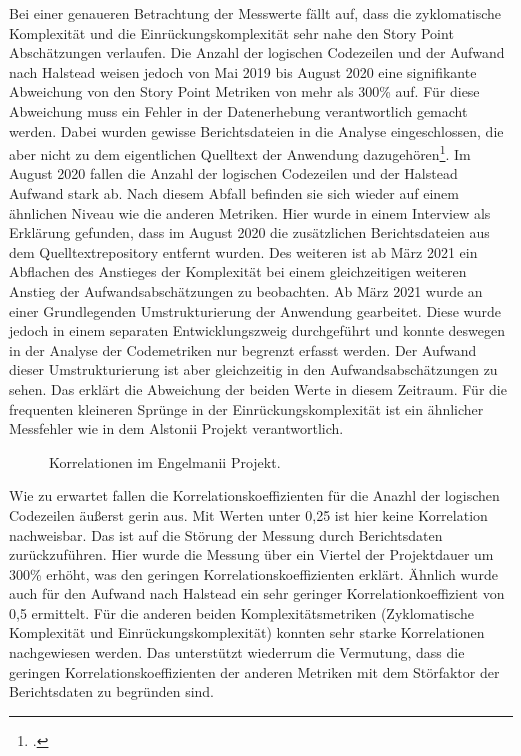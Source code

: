 Bei einer genaueren Betrachtung der Messwerte fällt auf, dass die
zyklomatische Komplexität und die Einrückungskomplexität sehr nahe den
Story Point Abschätzungen verlaufen. Die Anzahl der logischen Codezeilen
und der Aufwand nach Halstead weisen jedoch von Mai 2019 bis August 2020
eine signifikante Abweichung von den Story Point Metriken von mehr als
300\% auf. Für diese Abweichung muss ein Fehler in der Datenerhebung
verantwortlich gemacht werden. Dabei wurden gewisse Berichtsdateien in
die Analyse eingeschlossen, die aber nicht zu dem eigentlichen Quelltext
der Anwendung dazugehören\footcite[Vgl. ][]{stakeholdernInterviewMitStakeholdern2022}. Im August 2020
fallen die Anzahl der logischen Codezeilen und der Halstead Aufwand
stark ab. Nach diesem Abfall befinden sie sich wieder auf einem
ähnlichen Niveau wie die anderen Metriken. Hier wurde in einem Interview
als Erklärung gefunden, dass im August 2020 die zusätzlichen
Berichtsdateien aus dem Quelltextrepository entfernt wurden. Des
weiteren ist ab März 2021 ein Abflachen des Anstieges der Komplexität
bei einem gleichzeitigen weiteren Anstieg der Aufwandsabschätzungen zu
beobachten. Ab März 2021 wurde an einer Grundlegenden Umstrukturierung
der Anwendung gearbeitet. Diese wurde jedoch in einem separaten
Entwicklungszweig durchgeführt und konnte deswegen in der Analyse der
Codemetriken nur begrenzt erfasst werden. Der Aufwand dieser
Umstrukturierung ist aber gleichzeitig in den Aufwandsabschätzungen zu
sehen. Das erklärt die Abweichung der beiden Werte in diesem Zeitraum.
Für die frequenten kleineren Sprünge in der Einrückungskomplexität ist
ein ähnlicher Messfehler wie in dem Alstonii Projekt verantwortlich.

\begin{figure}\label{engelmanii-correlation-graph}
  \begin{center}
      
  \end{center}
  \caption{Korrelationen im Engelmanii Projekt.}
\end{figure} 

Wie zu erwartet fallen die Korrelationskoeffizienten für die Anazhl der
logischen Codezeilen äu\ss erst gerin aus. Mit Werten unter 0,25 ist hier
keine Korrelation nachweisbar. Das ist auf die Störung der Messung durch
Berichtsdaten zurückzuführen. Hier wurde die Messung über ein Viertel
der Projektdauer um 300\% erhöht, was den geringen
Korrelationskoeffizienten erklärt. Ähnlich wurde auch für den Aufwand
nach Halstead ein sehr geringer Korrelationkoeffizient von 0,5
ermittelt. Für die anderen beiden Komplexitätsmetriken (Zyklomatische
Komplexität und Einrückungskomplexität) konnten sehr starke
Korrelationen nachgewiesen werden. Das unterstützt wiederrum die
Vermutung, dass die geringen Korrelationskoeffizienten der anderen
Metriken mit dem Störfaktor der Berichtsdaten zu begründen sind.


